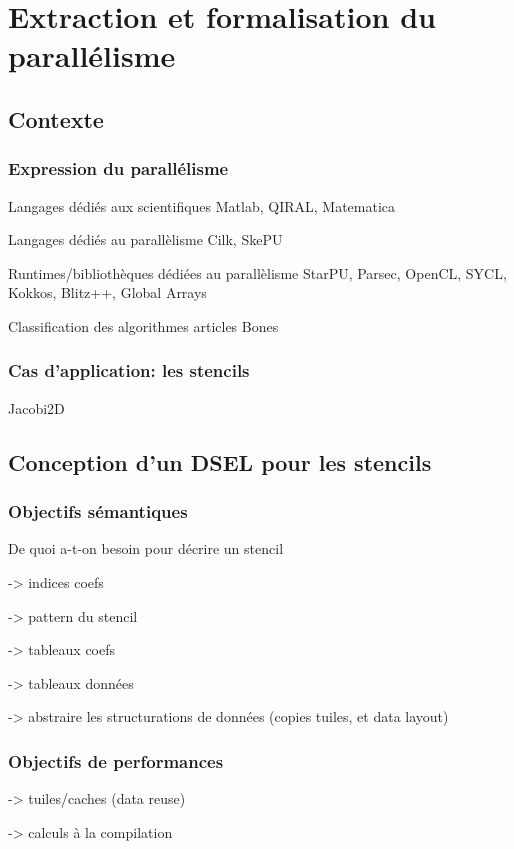 
\chapter{Extraction et formalisation du parallélisme}

\section{Contexte}

\subsection{Expression du parallélisme}

Langages dédiés aux scientifiques Matlab, QIRAL, Matematica

Langages dédiés au parallèlisme Cilk, SkePU

Runtimes/bibliothèques dédiées au parallèlisme StarPU, Parsec, OpenCL, SYCL, Kokkos, Blitz++, Global Arrays

Classification des algorithmes articles Bones

\subsection{Cas d'application: les stencils}

Jacobi2D

\section{Conception d'un DSEL pour les stencils}

\subsection{Objectifs sémantiques}

De quoi a-t-on besoin pour décrire un stencil

-> indices coefs

-> pattern du stencil

-> tableaux coefs

-> tableaux données

-> abstraire les structurations de données (copies tuiles, et data layout)

\subsection{Objectifs de performances}

-> tuiles/caches (data reuse)

-> calculs à la compilation

